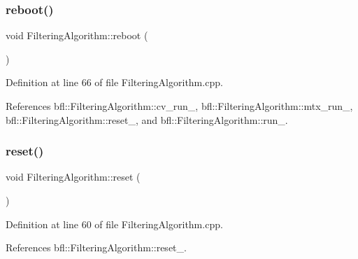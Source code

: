 \mbox{\label{classbfl_1_1FilteringAlgorithm_a6022859aa985474fb997343cc935b11e}} 
\subsubsection{\texorpdfstring{reboot()}{reboot()}}
{\footnotesize\ttfamily void Filtering\+Algorithm\+::reboot (\begin{DoxyParamCaption}{ }\end{DoxyParamCaption})\hspace{0.3cm}{\ttfamily [inherited]}}



Definition at line 66 of file Filtering\+Algorithm.\+cpp.



References bfl\+::\+Filtering\+Algorithm\+::cv\+\_\+run\+\_\+, bfl\+::\+Filtering\+Algorithm\+::mtx\+\_\+run\+\_\+, bfl\+::\+Filtering\+Algorithm\+::reset\+\_\+, and bfl\+::\+Filtering\+Algorithm\+::run\+\_\+.

\mbox{\label{classbfl_1_1FilteringAlgorithm_a2403c62fbd7bd7f5cda56a84f5f30331}} 
\subsubsection{\texorpdfstring{reset()}{reset()}}
{\footnotesize\ttfamily void Filtering\+Algorithm\+::reset (\begin{DoxyParamCaption}{ }\end{DoxyParamCaption})\hspace{0.3cm}{\ttfamily [inherited]}}



Definition at line 60 of file Filtering\+Algorithm.\+cpp.



References bfl\+::\+Filtering\+Algorithm\+::reset\+\_\+.

\mbox{\label{classbfl_1_1FilteringAlgorithm_a009cbe5f4bbb16967f6c6ddcaed8fbb1}} 
